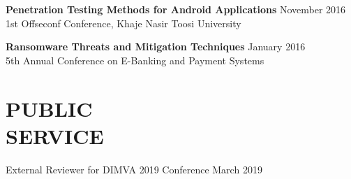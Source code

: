 \documentclass[margin, 10pt]{res} %
\begin{document}
\begin{resume}
\textbf{Penetration Testing Methods for Android Applications} \hfill November 2016\\
1st Offseconf Conference, Khaje Nasir Toosi University

\textbf{Ransomware Threats and Mitigation Techniques} \hfill January 2016 \\
5th Annual Conference on E-Banking and Payment Systems

\section{PUBLIC \\ SERVICE}

External Reviewer for DIMVA 2019 Conference \hfill March 2019 \\



 


\end{resume}
\end{document}
